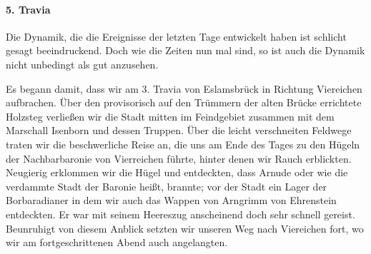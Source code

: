 \paragraph{5. Travia}
Die Dynamik, die die Ereignisse der letzten Tage entwickelt haben ist schlicht gesagt beeindruckend. Doch wie die Zeiten nun mal sind, so ist auch die Dynamik nicht unbedingt als gut anzusehen.

Es begann damit, dass wir am 3. Travia von Eslamsbrück in Richtung Viereichen aufbrachen. Über den provisorisch auf den Trümmern der alten Brücke errichtete Holzsteg verließen wir die Stadt mitten im Feindgebiet zusammen mit dem Marschall Isenborn und dessen Truppen. Über die leicht verschneiten Feldwege traten wir die beschwerliche Reise an, die uns am Ende des Tages zu den Hügeln der Nachbarbaronie von Vierreichen führte, hinter denen wir Rauch erblickten. Neugierig erklommen wir die Hügel und entdeckten, dass Arnude oder wie die verdammte Stadt der Baronie heißt, brannte; vor der Stadt ein Lager der Borbaradianer in dem wir auch das Wappen von Arngrimm von Ehrenstein entdeckten. Er war mit seinem Heereszug anscheinend doch sehr schnell gereist. Beunruhigt von diesem Anblick setzten wir unseren Weg nach Viereichen fort, wo wir am fortgeschrittenen Abend auch angelangten.

